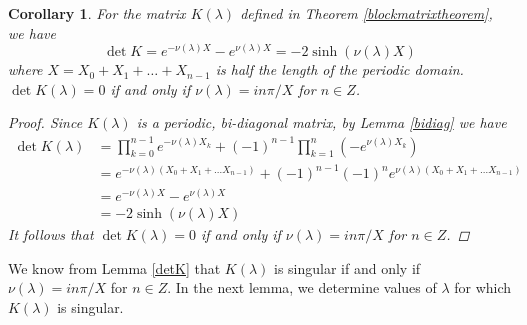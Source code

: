 \documentclass[12pt]{article}
\newtheorem{corollary}{Corollary}
\begin{document}
\begin{corollary}\label{detKcorr}
For the matrix $K(\lambda)$ defined in Theorem \ref{blockmatrixtheorem}, we have 
\begin{equation}\label{detK}
\det K = e^{-\nu(\lambda)X} - e^{\nu(\lambda)X} = -2 \sinh (\nu(\lambda) X)
\end{equation}
where $X = X_0 + X_1 + \dots + X_{n-1}$ is half the length of the periodic domain. $\det K(\lambda) = 0$ if and only if $\nu(\lambda) = i n \pi/X$ for $n \in Z$. 
\begin{proof}
Since $K(\lambda)$ is a periodic, bi-diagonal matrix, by Lemma \ref{bidiag} we have
\begin{align*}
\det K(\lambda) &= \prod_{k = 0}^{n-1} e^{-\nu(\lambda)X_k} + (-1)^{n-1} \prod_{k = 1}^n (-e^{\nu(\lambda)X_k}) \\
&= e^{-\nu(\lambda)(X_0 + X_1 + \dots X_{n-1})} + (-1)^{n-1} (-1)^n e^{\nu(\lambda)(X_0 + X_1 + \dots X_{n-1})} \\
&= e^{-\nu(\lambda)X} - e^{\nu(\lambda)X} \\
&= -2 \sinh (\nu(\lambda)X)
\end{align*}
It follows that $\det K(\lambda) = 0$ if and only if $\nu(\lambda) = i n \pi/X$ for $n \in Z$.
\end{proof}
\end{corollary}

We know from Lemma \ref{detK} that $K(\lambda)$ is singular if and only if $\nu(\lambda) = i n \pi/X$ for $n \in Z$. In the next lemma, we determine values of $\lambda$ for which $K(\lambda)$ is singular. 

\end{document}
